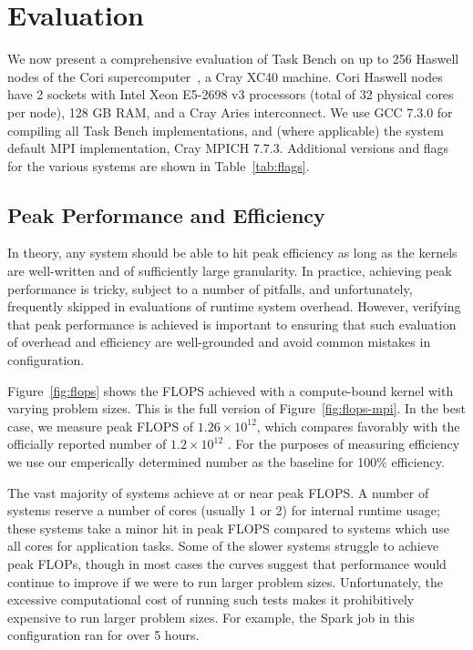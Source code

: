 \section{Evaluation}
\label{sec:evaluation}



We now present a comprehensive evaluation of Task Bench on up to 256
Haswell nodes of the Cori supercomputer~\cite{Cori}, a Cray XC40
machine. Cori Haswell nodes have 2 sockets with Intel Xeon E5-2698 v3
processors (total of 32 physical cores per node), 128 GB RAM, and a
Cray Aries interconnect. We use GCC 7.3.0 for compiling all Task Bench
implementations, and (where applicable) the system default MPI
implementation, Cray MPICH 7.7.3. Additional versions and flags for the
various systems are shown in Table~\ref{tab:flags}.

\subsection{Peak Performance and Efficiency}






In theory, any system should be able to hit peak efficiency as long as
the kernels are well-written and of sufficiently large granularity. In
practice, achieving peak performance is tricky, subject to a number of
pitfalls, and unfortunately, frequently skipped in evaluations of
runtime system overhead. However, verifying that peak performance is
achieved is important to ensuring that such evaluation of overhead and
efficiency are well-grounded and avoid common mistakes in
configuration.

Figure~\ref{fig:flops} shows the FLOPS achieved with a compute-bound
kernel with varying problem sizes. This is the full version of
Figure~\ref{fig:flops-mpi}. In the best case, we measure peak FLOPS of
$1.26 \times 10^{12}$, which compares favorably with the officially
reported number of $1.2 \times 10^{12}$ \cite{Cori}. For the purposes
of measuring efficiency we use our emperically determined number as
the baseline for 100\% efficiency.

The vast majority of systems achieve at or near peak FLOPS. A number
of systems reserve a number of cores (usually 1 or 2) for internal
runtime usage; these systems take a minor hit in peak FLOPS compared
to systems which use all cores for application tasks. Some of the
slower systems struggle to achieve peak FLOPs, though in most cases
the curves suggest that performance would continue to improve if we
were to run larger problem sizes. Unfortunately, the excessive
computational cost of running such tests makes it prohibitively
expensive to run larger problem sizes. For example, the Spark job in
this configuration ran for over 5 hours.

